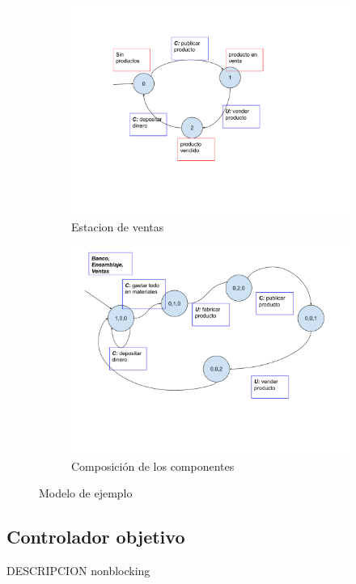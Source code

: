 \documentclass[11pt,a4paper,twoside]{tesis}
\begin{document}
\begin{figure}[htb]
\begin{center}
{\begin{subfigure}[t]{.7\textwidth}
		\centering
		\includegraphics[width=\linewidth]{figures/ModeloVentas.pdf}  
		\caption{Estacion de ventas}
		\label{fig:modeloVentas}
	\end{subfigure}
	\begin{subfigure}[t]{.7\textwidth}
	\centering
	\includegraphics[width=\linewidth]{figures/ModeloCompuestoSin2Caminos.pdf}  
	\caption{Composición de los componentes}
	\label{fig:compuesto}
	\end{subfigure}
	}
	\caption{Modelo de ejemplo}
	\label{fig:modelos}
	\end{center}
\end{figure}



\subsection{Controlador objetivo}
DESCRIPCION nonblocking
\\
\end{document}
